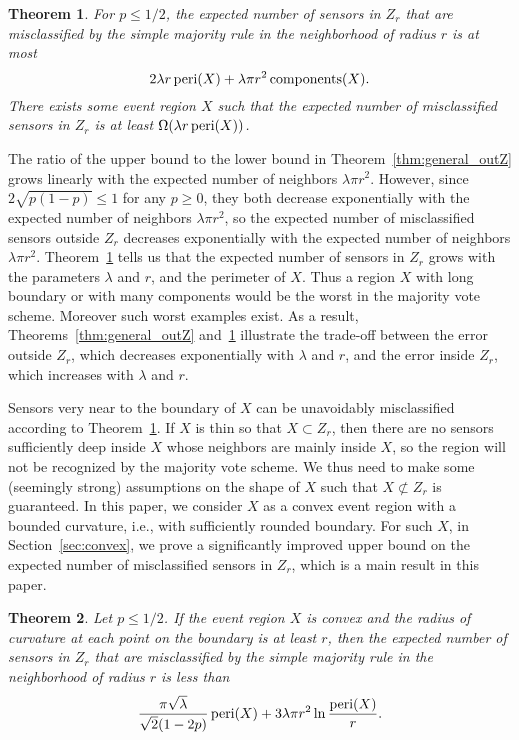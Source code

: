 \documentclass{article}
\newtheorem{theorem}{Theorem}
\def\peri{\mathop{\rm peri}}
\def\components{\mathop{\rm components}}
\begin{document}
\begin{theorem}\label{thm:general_inZ}
For $p \leq 1/2$, the expected number of sensors in $Z_r$ that are misclassified by the simple majority rule in the neighborhood of radius $r$ is at most
$$2\lambda r\peri(X) + \lambda \pi r^2\components(X).$$
There exists some event region $X$ such that the expected number of misclassified sensors in $Z_r$ is at least $\Omega(\lambda r\peri(X))$.
\end{theorem}

The ratio of the upper bound to the lower bound in Theorem~\ref{thm:general_outZ} grows linearly with the expected number of neighbors $\lambda\pi r^2$. However, since $2\sqrt{p(1-p)}\leq 1$ for any $p\geq 0$, they both decrease exponentially with the expected number of neighbors $\lambda\pi r^2$, so the expected number of misclassified sensors outside $Z_r$ decreases exponentially with the expected number of neighbors $\lambda\pi r^2$. Theorem~\ref{thm:general_inZ} tells us that the expected number of sensors in $Z_r$ grows with the parameters $\lambda$ and $r$, and the perimeter of $X$. Thus a region $X$ with long boundary or with many components would be the worst in the majority vote scheme. Moreover such worst examples exist. As a result, Theorems~\ref{thm:general_outZ} and~\ref{thm:general_inZ} illustrate the trade-off between the error outside $Z_r$, which decreases exponentially with $\lambda$ and $r$, and the error inside $Z_r$, which increases with $\lambda$ and $r$.

\par
Sensors very near to the boundary of $X$ can be unavoidably misclassified according to Theorem~\ref{thm:general_inZ}. If $X$ is thin so that $X \subset Z_r$, then there are no sensors sufficiently deep inside $X$ whose neighbors are mainly inside $X$, so the region will not be recognized by the majority vote scheme. We thus need to make some (seemingly strong) assumptions on the shape of $X$ such that $X\not\subset Z_r$ is guaranteed. In this paper, we consider $X$ as a convex event region with a bounded curvature, i.e., with sufficiently rounded boundary. For such $X$, in Section~\ref{sec:convex}, we prove a significantly improved upper bound on the expected number of misclassified sensors in $Z_r$, which is a main result in this paper.

\begin{theorem}\label{thm:convex}
Let $p\leq 1/2$. If the event region $X$ is convex and the radius of curvature at each point on the boundary is at least $r$, then the expected number of sensors in $Z_r$ that are misclassified by the simple majority rule in the neighborhood of radius $r$ is less than
$${\pi\sqrt{\lambda}\over \sqrt{2}(1-2p)} \peri(X) + 3 \lambda\pi r^2 \ln{\peri(X)\over r}.$$
\end{theorem}
\end{document}
